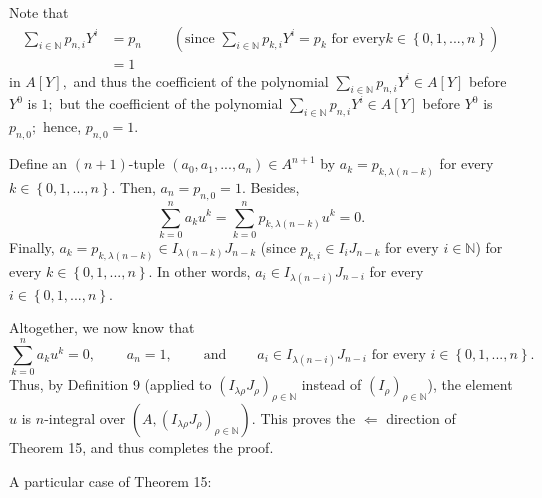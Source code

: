 \documentclass[12pt,final,notitlepage,onecolumn]{article}%
\begin{document}
Note that%
\begin{align*}
\sum\limits_{i\in\mathbb{N}}p_{n,i}Y^{i}  &  =p_{n}\ \ \ \ \ \ \ \ \ \ \left(
\text{since }\sum\limits_{i\in\mathbb{N}}p_{k,i}Y^{i}=p_{k}\text{ for every
}k\in\left\{  0,1,...,n\right\}  \right) \\
&  =1
\end{align*}
in $A\left[  Y\right]  ,$ and thus the coefficient of the polynomial
$\sum\limits_{i\in\mathbb{N}}p_{n,i}Y^{i}\in A\left[  Y\right]  $ before
$Y^{0}$ is $1;$ but the coefficient of the polynomial $\sum\limits_{i\in
\mathbb{N}}p_{n,i}Y^{i}\in A\left[  Y\right]  $ before $Y^{0}$ is $p_{n,0};$
hence, $p_{n,0}=1$.

Define an $\left(  n+1\right)  $-tuple $\left(  a_{0},a_{1},...,a_{n}\right)
\in A^{n+1}$ by $a_{k}=p_{k,\lambda\left(  n-k\right)  }$ for every
$k\in\left\{  0,1,...,n\right\}  .$ Then, $a_{n}=p_{n,0}=1$. Besides,%
\[
\sum\limits_{k=0}^{n}a_{k}u^{k}=\sum\limits_{k=0}^{n}p_{k,\lambda\left(
n-k\right)  }u^{k}=0.
\]
Finally, $a_{k}=p_{k,\lambda\left(  n-k\right)  }\in I_{\lambda\left(
n-k\right)  }J_{n-k}$ (since $p_{k,i}\in I_{i}J_{n-k}$ for every
$i\in\mathbb{N}$) for every $k\in\left\{  0,1,...,n\right\}  $. In other
words, $a_{i}\in I_{\lambda\left(  n-i\right)  }J_{n-i}$ for every
$i\in\left\{  0,1,...,n\right\}  $.

Altogether, we now know that%
\[
\sum\limits_{k=0}^{n}a_{k}u^{k}=0,\ \ \ \ \ \ \ \ \ \ a_{n}%
=1,\ \ \ \ \ \ \ \ \ \ \text{and}\ \ \ \ \ \ \ \ \ \ a_{i}\in I_{\lambda
\left(  n-i\right)  }J_{n-i}\text{ for every }i\in\left\{  0,1,...,n\right\}
.
\]
Thus, by Definition 9 (applied to $\left(  I_{\lambda\rho}J_{\rho}\right)
_{\rho\in\mathbb{N}}$ instead of $\left(  I_{\rho}\right)  _{\rho\in
\mathbb{N}}$), the element $u$ is $n$-integral over $\left(  A,\left(
I_{\lambda\rho}J_{\rho}\right)  _{\rho\in\mathbb{N}}\right)  $. This proves
the $\Longleftarrow$ direction of Theorem 15, and thus completes the proof.

A particular case of Theorem 15:
\end{document}
